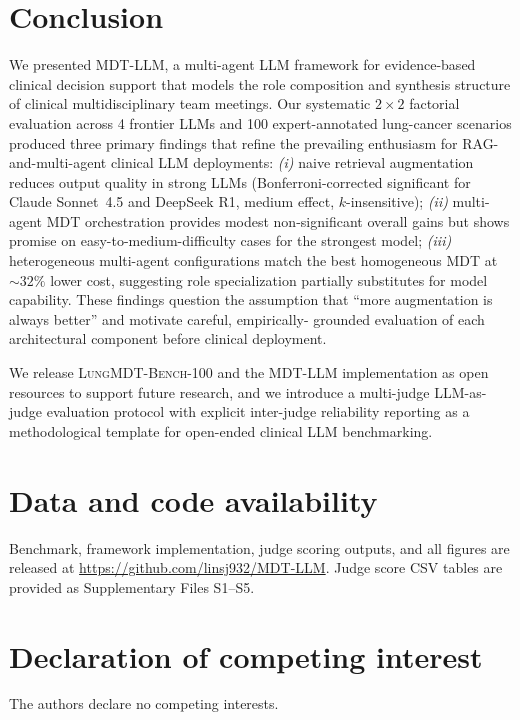 \documentclass[final, 11pt, 3p]{elsarticle}
\newcommand{\MDTLLM}{\textsc{MDT-LLM}}
\newcommand{\BENCH}{\textsc{LungMDT-Bench-100}}
\begin{document}
\section{Conclusion}
\label{sec:conclusion}

We presented \MDTLLM, a multi-agent LLM framework for evidence-based
clinical decision support that models the role composition and
synthesis structure of clinical multidisciplinary team meetings. Our
systematic $2{\times}2$ factorial evaluation across 4 frontier LLMs
and 100 expert-annotated lung-cancer scenarios produced three primary
findings that refine the prevailing enthusiasm for RAG-and-multi-agent
clinical LLM deployments: \emph{(i)} naive retrieval augmentation
reduces output quality in strong LLMs (Bonferroni-corrected significant
for Claude Sonnet~4.5 and DeepSeek R1, medium effect, $k$-insensitive);
\emph{(ii)} multi-agent MDT orchestration provides modest non-significant
overall gains but shows promise on easy-to-medium-difficulty cases for
the strongest model; \emph{(iii)} heterogeneous multi-agent
configurations match the best homogeneous MDT at $\sim{}32\%$ lower cost,
suggesting role specialization partially substitutes for model
capability. These findings question the assumption that ``more
augmentation is always better'' and motivate careful, empirically-
grounded evaluation of each architectural component before clinical
deployment.

We release \BENCH{} and the \MDTLLM{} implementation as open
resources to support future research, and we introduce a multi-judge
LLM-as-judge evaluation protocol with explicit inter-judge reliability
reporting as a methodological template for open-ended clinical LLM
benchmarking.

\section*{Data and code availability}
Benchmark, framework implementation, judge scoring outputs, and all
figures are released at \url{https://github.com/linsj932/MDT-LLM}.
Judge score CSV tables are provided as Supplementary Files S1--S5.

\section*{Declaration of competing interest}
The authors declare no competing interests.
\end{document}
